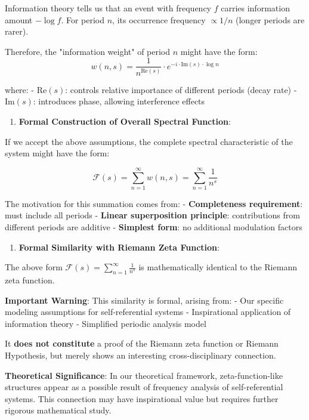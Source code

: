    Information theory tells us that an event with frequency $f$ carries information amount $-\log f$.
   For period $n$, its occurrence frequency $\propto 1/n$ (longer periods are rarer).
   
   Therefore, the "information weight" of period $n$ might have the form:
\begin{equation}
w(n,s) = \frac{1}{n^{\text{Re}(s)}} \cdot e^{-i \cdot \text{Im}(s) \cdot \log n}
\end{equation}
   
   where:
   - $\text{Re}(s)$: controls relative importance of different periods (decay rate)
   - $\text{Im}(s)$: introduces phase, allowing interference effects
   
\begin{enumerate}
\item \textbf{Formal Construction of Overall Spectral Function}:
\end{enumerate}
   
   If we accept the above assumptions, the complete spectral characteristic of the system might have the form:
   
\begin{equation}
\mathcal{F}(s) = \sum_{n=1}^{\infty} w(n,s) = \sum_{n=1}^{\infty} \frac{1}{n^s}
\end{equation}
   
   The motivation for this summation comes from:
   - \textbf{Completeness requirement}: must include all periods
   - \textbf{Linear superposition principle}: contributions from different periods are additive
   - \textbf{Simplest form}: no additional modulation factors

\begin{enumerate}
\item \textbf{Formal Similarity with Riemann Zeta Function}:
\end{enumerate}
   The above form $\mathcal{F}(s) = \sum_{n=1}^{\infty} \frac{1}{n^s}$ is mathematically identical to the Riemann zeta function.
   
   \textbf{Important Warning}: This similarity is formal, arising from:
   - Our specific modeling assumptions for self-referential systems
   - Inspirational application of information theory
   - Simplified periodic analysis model
   
   It \textbf{does not constitute} a proof of the Riemann zeta function or Riemann Hypothesis, but merely shows an interesting cross-disciplinary connection.

\textbf{Theoretical Significance}: In our theoretical framework, zeta-function-like structures appear as a possible result of frequency analysis of self-referential systems. This connection may have inspirational value but requires further rigorous mathematical study.

